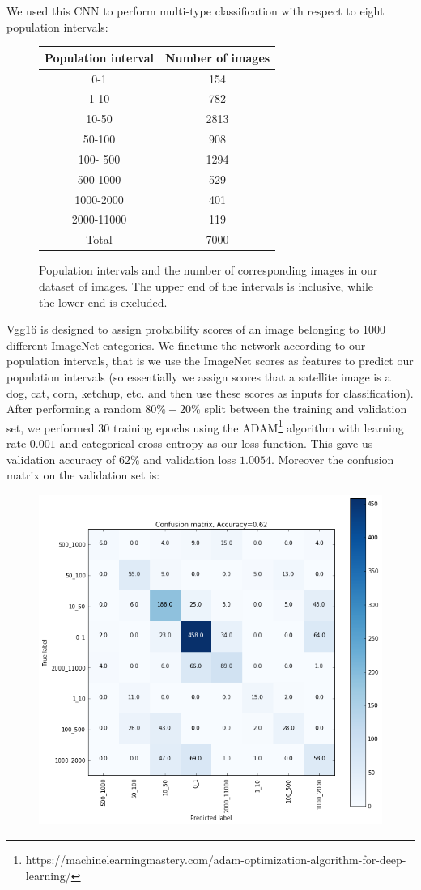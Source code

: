 \documentclass{article}
\begin{document}
We used this CNN to perform multi-type classification with respect to eight population intervals:
\begin{figure}[ht]
\center
\begin{tabular}{ |c|c| } 
\hline
Population interval & Number of images\\
\hline
0-1& 154\\ 
1-10& 782\\ 
10-50& 2813\\
50-100& 908\\
100- 500& 1294\\
500-1000& 529\\
1000-2000& 401\\
2000-11000& 119\\
Total& 7000\\
\hline
\end{tabular}
\caption{Population intervals and the number of corresponding images in our dataset of images. The upper end of the intervals is inclusive, while the lower end is excluded.}
\end{figure}

Vgg16 is designed to assign probability scores of an image belonging to 1000 different ImageNet categories. We finetune the network according to our population intervals, that is we use the ImageNet scores as features to predict our population intervals (so essentially we assign scores that a satellite image is a dog, cat, corn, ketchup, etc. and then use these scores as inputs for classification). After performing a random $80\%-20\%$ split between the training and validation set, we performed 30 training epochs using the ADAM\footnote{https://machinelearningmastery.com/adam-optimization-algorithm-for-deep-learning/} algorithm with learning rate $0.001$ and categorical cross-entropy as our loss function. This gave us validation accuracy of $62\%$ and validation loss $1.0054$. Moreover the confusion matrix on the validation set is:
\begin{figure}[ht]
\centering
\includegraphics[scale=0.45]{conf_mx_Zsolt1.png}
\end{figure}
\end{document}

